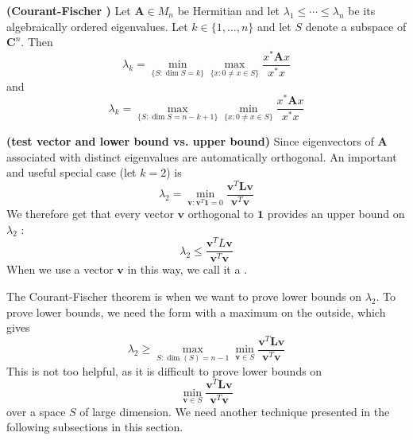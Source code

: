 \documentclass{article}
\newcommand{\bsl}[1]{\boldsymbol{#1}}
\newcommand{\bfs}[1]{\textbf{({#1}) }}
\begin{document}
\begin{thma}{\bfs{Courant-Fischer \cite[Page 236]{horn2012matrix}}}
Let $\bsl{A} \in M_{n}$ be Hermitian and let $\lambda_{1} \leq \cdots \leq \lambda_{n}$ be its algebraically ordered eigenvalues. Let $k \in\{1, \ldots, n\}$ and let $S$ denote a subspace of $\mathbf{C}^{n} .$ Then
$$
\lambda_{k}=\min _{\{S: \operatorname{dim} S=k\}} \max _{\{x: 0 \neq x \in S\}} \frac{x^{*} \bsl{A} x}{x^{*} x}
$$
and
$$
\lambda_{k}=\max _{\{S: \operatorname{dim} S=n-k+1\}} \min _{\{x: 0 \neq x \in S\}} \frac{x^{*} \bsl{A} x}{x^{*} x}
$$
\end{thma} 
\begin{rema}{\bfs{test vector and lower bound vs. upper bound}}
Since eigenvectors of $\bsl{A}$ associated with distinct eigenvalues are automatically orthogonal. An important and useful special case (let $k=2$) is 
$$
\lambda_{2}=\min _{\boldsymbol{v}: \boldsymbol{v}^{T} \mathbf{1}=0} \frac{\boldsymbol{v}^{T} \boldsymbol{L} \boldsymbol{v}}{\boldsymbol{v}^{T} \boldsymbol{v}}
$$
We therefore get that every vector $\boldsymbol{v}$ orthogonal to $\mathbf{1}$ provides an upper bound on $\lambda_{2}$ :
$$
\lambda_{2} \leq \frac{\boldsymbol{v}^{T} L \boldsymbol{v}}{\boldsymbol{v}^{T} \boldsymbol{v}}
$$
When we use a vector $\boldsymbol{v}$ in this way, we call it a .

The Courant-Fischer theorem is  when we want to prove lower bounds on $\lambda_{2}$. To prove lower bounds, we need the form with a maximum on the outside, which gives
$$
\lambda_{2} \geq \max _{S: \operatorname{dim}(S)=n-1} \min _{\boldsymbol{v} \in S} \frac{\boldsymbol{v}^{T} \boldsymbol{L} \boldsymbol{v}}{\boldsymbol{v}^{T} \boldsymbol{v}}
$$
This is not too helpful, as it is difficult to prove lower bounds on
$$
\min _{\boldsymbol{v} \in S} \frac{\boldsymbol{v}^{T} \boldsymbol{L} \boldsymbol{v}}{\boldsymbol{v}^{T} \boldsymbol{v}}
$$
over a space $S$ of large dimension. We need another technique presented in the following subsections in this section.
\end{rema}
\end{document}
